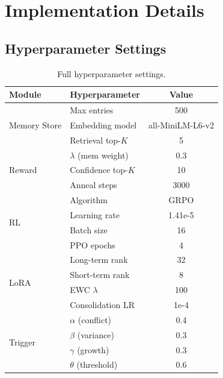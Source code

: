 \documentclass{article}
\begin{document}



\appendix
\section{Implementation Details}
\label{app:implementation}

\subsection{Hyperparameter Settings}

\begin{table}[h]
\centering
\small
\caption{Full hyperparameter settings.}
\begin{tabular}{llc}
\toprule
\textbf{Module} & \textbf{Hyperparameter} & \textbf{Value} \\
\midrule
\multirow{3}{*}{Memory Store} & Max entries & 500 \\
& Embedding model & all-MiniLM-L6-v2 \\
& Retrieval top-$K$ & 5 \\
\midrule
\multirow{3}{*}{Reward} & $\lambda$ (mem weight) & 0.3 \\
& Confidence top-$K$ & 10 \\
& Anneal steps & 3000 \\
\midrule
\multirow{4}{*}{RL} & Algorithm & GRPO \\
& Learning rate & 1.41e-5 \\
& Batch size & 16 \\
& PPO epochs & 4 \\
\midrule
\multirow{4}{*}{LoRA} & Long-term rank & 32 \\
& Short-term rank & 8 \\
& EWC $\lambda$ & 100 \\
& Consolidation LR & 1e-4 \\
\midrule
\multirow{4}{*}{Trigger} & $\alpha$ (conflict) & 0.4 \\
& $\beta$ (variance) & 0.3 \\
& $\gamma$ (growth) & 0.3 \\
& $\theta$ (threshold) & 0.6 \\
\bottomrule
\end{tabular}
\end{table}
\end{document}
